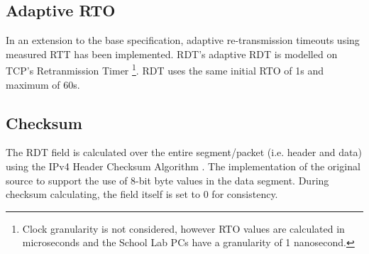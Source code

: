 \subsection{Adaptive RTO}
In an extension to the base specification, adaptive re-transmission timeouts using measured RTT has been implemented. RDT's adaptive RDT is modelled on TCP's Retranmission Timer \cite{rfc6298} \footnote{Clock granularity is not considered, however RTO values are calculated in microseconds and the School Lab PCs have a granularity of 1 nanosecond.}. RDT uses the same initial RTO of 1s and maximum of 60s. 


\subsection{Checksum}
The RDT  field is calculated over the entire segment/packet (i.e. header and data) using the IPv4 Header Checksum Algorithm \cite{rfc791}. The implementation of the original source \cite{ipv4_checksum} to support the use of 8-bit byte values in the data segment. During checksum calculating, the  field itself is set to 0 for consistency.